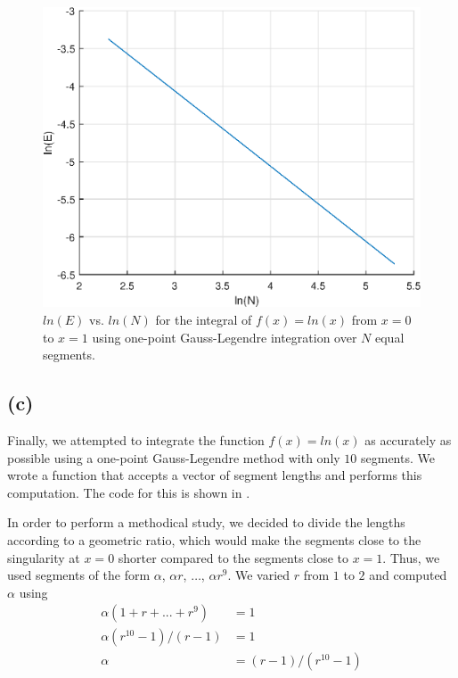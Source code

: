 \documentclass[journal,hidelinks]{IEEEtran}
\begin{document}
\begin{figure}[!htb]
  \centering
  \includegraphics[width=\columnwidth]{question-4/q4b.eps}
  \caption{$ln(E)$ vs. $ln(N)$ for the integral of $f(x) = ln(x)$ from $x = 0$ to $x = 1$ using one-point Gauss-Legendre integration over $N$ equal segments.}
  \label{fig:q4b}
\end{figure}

\subsection*{(c)}

Finally, we attempted to integrate the function $f(x) = ln(x)$ as accurately as possible using a one-point Gauss-Legendre method with only $10$ segments. We wrote a function that accepts a vector of segment lengths and performs this computation. The code for this is shown in .

In order to perform a methodical study, we decided to divide the lengths according to a geometric ratio, which would make the segments close to the singularity at $x = 0$ shorter compared to the segments close to $x = 1$. Thus, we used segments of the form $\alpha$, $\alpha r$, $\ldots$, $\alpha r^9$. We varied $r$ from $1$ to $2$ and computed $\alpha$ using
\begin{align}
\alpha (1 + r + ... + r^{9}) &= 1 \\
\alpha (r^{10} - 1) / (r - 1) &= 1 \\
\alpha &= (r - 1) / (r^{10} - 1)
\end{align}
\end{document}

